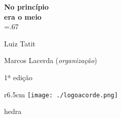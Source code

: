 




\begingroup\thispagestyle{empty}\vspace*{-.01\textheight}\parindent=0pt 
              \formular
              \huge 
              \textbf{No princípio\\era o meio}\\\baselineskip=.67\baselineskip 

              \medskip
              
              \LARGE
              Luiz Tatit
              
              \vspace{4cm}              

              \newfontfamily{}
              {\selectfont\minion\small Marcos Lacerda (\textit{organização})}
              
              \vspace{0.5cm}

              {\selectfont\minion\footnotesize
              1ª edição}
                    
              \vfill
              
              \begin{wrapfigure}{r}{6.5cm}
              \vspace*{-1.22\baselineskip}
              \texttt{[image: ./logoacorde.png]}
              \end{wrapfigure}

              \newfontfamily{}
              {\fontsize{30}{40}\selectfont \timesnewroman hedra}
              
